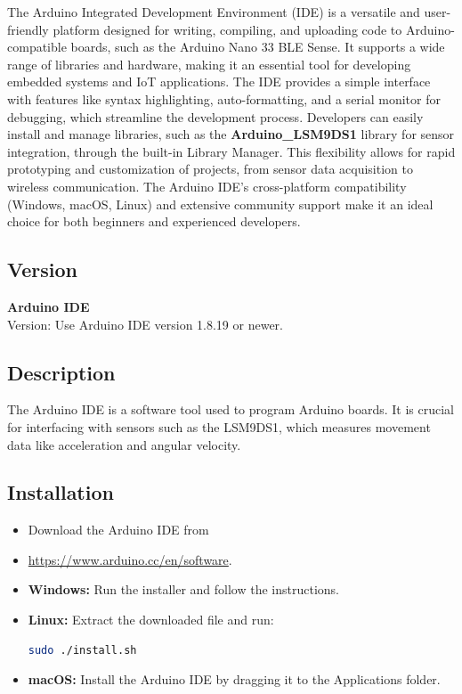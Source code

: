 The Arduino Integrated Development Environment (IDE) is a versatile and user-friendly platform designed for writing, compiling, and uploading code to Arduino-compatible boards, such as the Arduino Nano 33 BLE Sense. It supports a wide range of libraries and hardware, making it an essential tool for developing embedded systems and IoT applications. The IDE provides a simple interface with features like syntax highlighting, auto-formatting, and a serial monitor for debugging, which streamline the development process. Developers can easily install and manage libraries, such as the \textbf{Arduino\_LSM9DS1} library for sensor integration, through the built-in Library Manager. This flexibility allows for rapid prototyping and customization of projects, from sensor data acquisition to wireless communication. The Arduino IDE's cross-platform compatibility (Windows, macOS, Linux) and extensive community support make it an ideal choice for both beginners and experienced developers.\cite{ArduinoIDE:2024}

\subsection*{Version}
\textbf{Arduino IDE} \\
Version: Use Arduino IDE version 1.8.19 or newer.

\subsection*{Description}
The Arduino IDE is a software tool used to program Arduino boards. It is crucial for interfacing with sensors such as the LSM9DS1, which measures movement data like acceleration and angular velocity\cite{ArduinoIDE:2024}.

\subsection*{Installation}
\begin{itemize}
	\item Download the Arduino IDE from 
	\item\href{https://www.arduino.cc/en/software}{https://www.arduino.cc/en/software}.
	\item \textbf{Windows:} Run the installer and follow the instructions.
	\item \textbf{Linux:} Extract the downloaded file and run:
	\begin{lstlisting}[language=bash]
		sudo ./install.sh
	\end{lstlisting}

\item \textbf{macOS:} Install the Arduino IDE by dragging it to the Applications folder.
\end{itemize}

